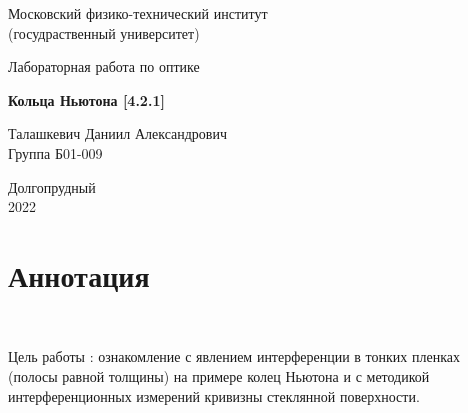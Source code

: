 \documentclass[a4paper, 12pt]{article}%
\begin{document}


\begin{titlepage}

	\newpage
	\begin{center}
		\normalsize Московский физико-технический институт \\(госудраственный 			университет)
	\end{center}

	\vspace{6em}

	\begin{center}
		\Large Лабораторная работа по оптике\\
	\end{center}

	\vspace{1em}

	\begin{center}
		\large \textbf{Кольца Ньютона [4.2.1]}
	\end{center}

	\vspace{2em}

	\begin{center}
		\large Талашкевич Даниил Александрович\\
		Группа Б01-009
	\end{center}

	\vspace{\fill}

	\begin{center}
	Долгопрудный \\2022
	\end{center}
	
\end{titlepage}



	\thispagestyle{empty}
	\newpage
	\tableofcontents
	\newpage
	\setcounter{page}{1}



\section{Аннотация}

$\text{ }$

$\textbf{Цель работы}$ : ознакомление с явлением интерференции в тонких пленках (полосы равной толщины) на примере колец Ньютона и с методикой интерференционных измерений кривизны стеклянной поверхности.
\end{document}

